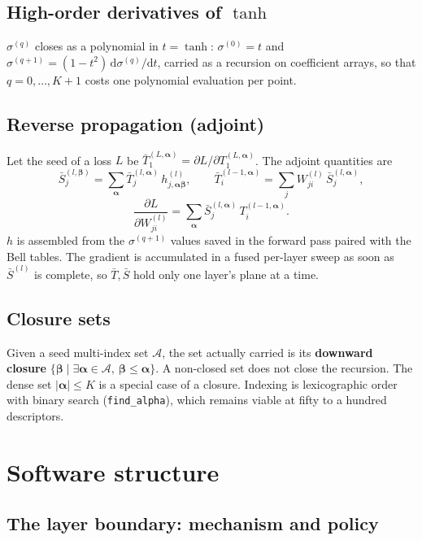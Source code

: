 \documentclass[10pt,a4paper]{article}
\newcommand{\code}[1]{\texttt{#1}}
\newcommand{\mi}[1]{\boldsymbol{#1}}
\begin{document}
\subsection{High-order derivatives of $\tanh$}

$\sigma^{(q)}$ closes as a polynomial in $t=\tanh$:
$\sigma^{(0)}=t$ and
$\sigma^{(q+1)}=(1-t^2)\,\mathrm{d}\sigma^{(q)}/\mathrm{d}t$,
carried as a recursion on coefficient arrays, so that
$q=0,\dots,K+1$ costs one polynomial evaluation per point.

\subsection{Reverse propagation (adjoint)}

Let the seed of a loss $L$ be
$\bar T^{(L,\mi\alpha)}_1=\partial L/\partial T^{(L,\mi\alpha)}_1$.
The adjoint quantities are
\[
\bar S^{(l,\mi\beta)}_j=\sum_{\mi\alpha} \bar T^{(l,\mi\alpha)}_j\, h^{(l)}_{j,\mi\alpha\mi\beta},
\qquad
\bar T^{(l-1,\mi\alpha)}_i=\sum_j W^{(l)}_{ji}\,\bar S^{(l,\mi\alpha)}_j,
\]
\[
\frac{\partial L}{\partial W^{(l)}_{ji}}=\sum_{\mi\alpha}\bar S^{(l,\mi\alpha)}_j\,T^{(l-1,\mi\alpha)}_i .
\]
$h$ is assembled from the $\sigma^{(q+1)}$ values saved in the forward
pass paired with the Bell tables. The gradient is accumulated in a
fused per-layer sweep as soon as $\bar S^{(l)}$ is complete, so
$\bar T,\bar S$ hold only one layer's plane at a time.

\subsection{Closure sets}

Given a seed multi-index set $\mathcal{A}$, the set actually carried is
its \textbf{downward closure}
$\{\mi\beta \mid \exists \mi\alpha\in\mathcal{A},\ \mi\beta\le\mi\alpha\}$.
A non-closed set does not close the recursion. The dense set
$|\mi\alpha|\le K$ is a special case of a closure. Indexing is
lexicographic order with binary search (\code{find\_alpha}), which
remains viable at fifty to a hundred descriptors.

\section{Software structure}

\subsection{The layer boundary: mechanism and policy}
\label{sec:boundary}
\end{document}
